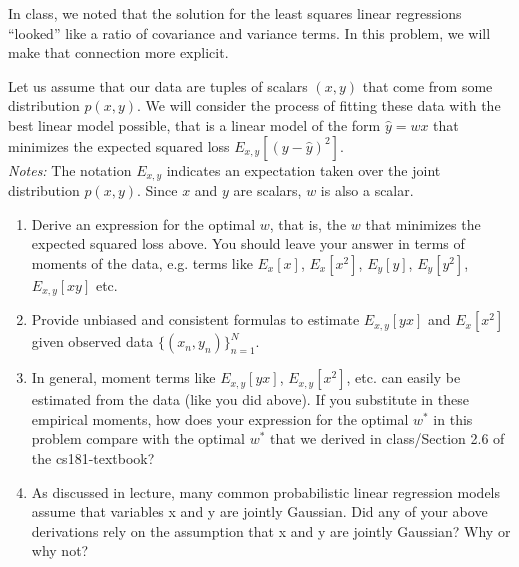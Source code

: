 \documentclass[submit]{harvardml}
\begin{document}
\begin{problem}

  In class, we noted that the solution for the least squares linear
  regressions ``looked'' like a ratio of covariance and variance
  terms.  In this problem, we will make that connection more explicit.

  Let us assume that our data are tuples of scalars $(x,y)$ that come from
  some distribution $p(x,y)$.  We will consider the process of fitting
  these data with the best linear model possible, that is a linear
  model of the form $\hat{y} = wx$ that minimizes the expected squared
  loss $E_{x,y}[ ( y - \hat{y} )^2 ]$.\\

\noindent \emph{Notes:} The notation $E_{x, y}$ indicates an
expectation taken over the joint distribution $p(x,y)$.  Since $x$ and
$y$ are scalars, $w$ is also a scalar.
  
  \begin{enumerate}

  \item Derive an expression for the optimal $w$, that is, the $w$
    that minimizes the expected squared loss above.  You should leave
    your answer in terms of moments of the data, e.g. terms like
    $E_x[x]$, $E_x[x^2]$, $E_y[y]$, $E_y[y^2]$, $E_{x,y}[xy]$ etc.

\item Provide unbiased and consistent formulas to estimate $E_{x, y}[yx]$
 and $E_x[x^2]$ given observed data $\{(x_n,y_n)\}_{n=1}^N$.

\item In general, moment terms like $E_{x, y}[yx]$, $E_{x, y}[x^2]$,
  etc. can easily be estimated from the data (like you did above).  If
  you substitute in these empirical moments, how does your expression
  for the optimal $w^*$ in this problem compare with the optimal $w^*$
  that we derived in class/Section 2.6 of the cs181-textbook?

\item As discussed in lecture, many common probabilistic linear regression models assume that variables x and y are jointly Gaussian.  Did any of your above derivations rely on the assumption that x and y are jointly Gaussian?  Why or why not?
    
\end{enumerate}

\end{problem}
\end{document}
